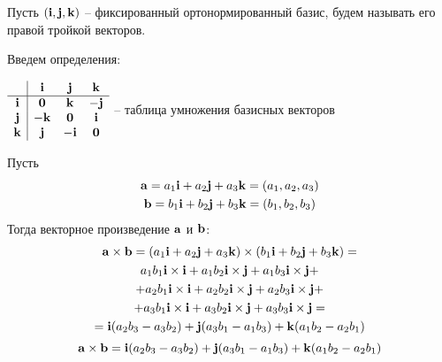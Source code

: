 \documentclass[main]{subfiles}
\begin{document}
\begin{definition}
    Пусть $(\mathbf{i}, \mathbf{j}, \mathbf{k})$ -- фиксированный ортонормированный базис,
    будем называть его правой тройкой векторов.

    Введем определения:
    \begin{center}
        $\begin{array}{c|ccc}
                    & \mathbf{i}  & \mathbf{j}  & \mathbf{k}  \\ \hline
                \mathbf{i} & \mathbf{0}  & \mathbf{k}  & -\mathbf{j} \\
                \mathbf{j} & -\mathbf{k} & \mathbf{0}  & \mathbf{i}  \\
                \mathbf{k} & \mathbf{j}  & -\mathbf{i} & \mathbf{0}
            \end{array}$
        -- таблица умножения базисных векторов
    \end{center}

    Пусть
    \begin{gather*}
        \mathbf{a} = a_1 \mathbf{i} + a_2 \mathbf{j} + a_3 \mathbf{k} = (a_1, a_2, a_3)\\
        \mathbf{b} = b_1 \mathbf{i} + b_2 \mathbf{j} + b_3 \mathbf{k} = (b_1, b_2, b_3)
    \end{gather*}
    Тогда векторное произведение $\mathbf{a}$ и $\mathbf{b}$:
    \begin{multline*}
        \mathbf{a} \times \mathbf{b} =
        (a_1 \mathbf{i} + a_2 \mathbf{j} + a_3 \mathbf{k}) \times (b_1 \mathbf{i} + b_2 \mathbf{j} + b_3 \mathbf{k})=\\
        a_1 b_1 \mathbf{i} \times \mathbf{i} + a_1 b_2 \mathbf{i} \times \mathbf{j} + a_1 b_3 \mathbf{i} \times \mathbf{j}+\\
        +a_2 b_1 \mathbf{i} \times \mathbf{i} + a_2 b_2 \mathbf{i} \times \mathbf{j} + a_2 b_3 \mathbf{i} \times \mathbf{j}+\\
        +a_3 b_1 \mathbf{i} \times \mathbf{i} + a_3 b_2 \mathbf{i} \times \mathbf{j} + a_3 b_3 \mathbf{i} \times \mathbf{j}=\\
        = \mathbf{i} (a_2 b_3 - a_3 b_2)+ \mathbf{j} (a_3 b_1 - a_1 b_3) + \mathbf{k} (a_1 b_2 - a_2 b_1)
    \end{multline*}
    \[\mathbf{a} \times \mathbf{b} = \mathbf{i} (a_2 b_3 - a_3 b_2)+ \mathbf{j} (a_3 b_1 - a_1 b_3) + \mathbf{k} (a_1 b_2 - a_2 b_1)\]
\end{definition}
\end{document}
